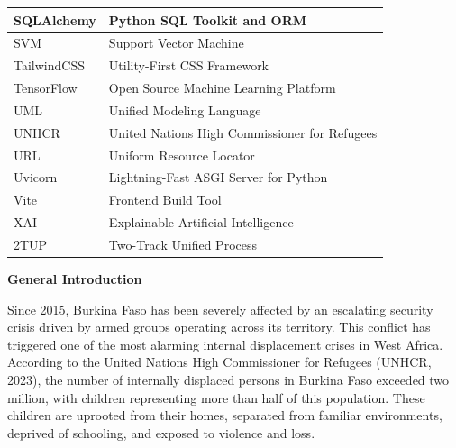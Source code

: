 \documentclass[a4paper,12pt,oneside]{report}
\renewcommand{\thepage}{\roman{page}}
\begin{document}
\begin{longtable}{|p{3.5cm}|p{10.5cm}|}
\hline
SQLAlchemy & Python SQL Toolkit and ORM \\
\hline
SVM      & Support Vector Machine \\
\hline
TailwindCSS & Utility-First CSS Framework \\
\hline
TensorFlow & Open Source Machine Learning Platform \\
\hline
UML      & Unified Modeling Language \\
\hline
UNHCR    & United Nations High Commissioner for Refugees \\
\hline
URL      & Uniform Resource Locator \\
\hline
Uvicorn  & Lightning-Fast ASGI Server for Python \\
\hline
Vite     & Frontend Build Tool \\
\hline
XAI      & Explainable Artificial Intelligence \\
\hline
2TUP     & Two-Track Unified Process \\
\hline
\end{longtable}
\clearpage

\listoffigures
\clearpage

\listoftables
\clearpage

\renewcommand{\thepage}{\arabic{page}}
\setcounter{page}{1}

\newpage
\thispagestyle{fancy}
{\LARGE \bfseries \noindent General Introduction}
\vspace{2em}
\justifying

Since 2015, Burkina Faso has been severely affected by an escalating security
crisis driven by armed groups operating across its territory. This conflict has
triggered one of the most alarming internal displacement crises in West Africa.
According to the United Nations High Commissioner for Refugees (UNHCR, 2023),
the number of internally displaced persons in Burkina Faso exceeded two million,
with children representing more than half of this population. These children are
uprooted from their homes, separated from familiar environments, deprived of
schooling, and exposed to violence and loss.
\end{document}
